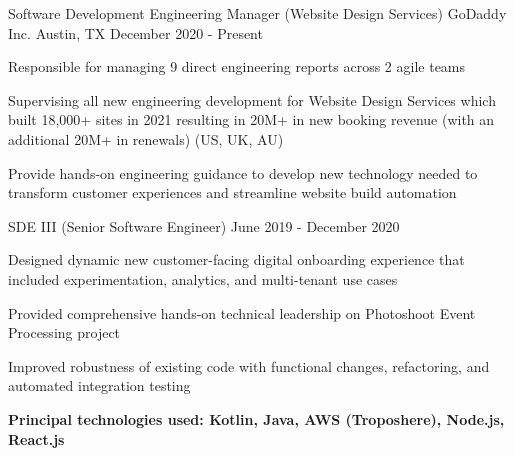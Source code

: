 

\begin{cventries}

  \cventry
    {Software Development Engineering Manager (Website Design Services)} %
    {GoDaddy Inc.} %
    {Austin, TX} %
    {December 2020 - Present} %
    {
      \begin{cvitems} %
        \item {Responsible for managing 9 direct engineering reports across 2 agile teams}
        \item {Supervising all new engineering development for Website Design Services which built 18,000+ sites in 2021 resulting in 20M+ in new booking revenue (with an additional 20M+ in renewals) (US, UK, AU)}
        \item {Provide hands-on engineering guidance to develop new technology needed to transform customer experiences and
streamline website build automation}
      \end{cvitems}
    }

  \cventry
    {SDE III (Senior Software Engineer)} %
    {} %
    {} %
    {June 2019 - December 2020} %
    {
      \begin{cvitems} %
              \item {Designed dynamic new customer-facing digital onboarding experience that included experimentation, analytics, and multi-tenant use cases}
        \item {Provided comprehensive hands-on technical leadership on Photoshoot Event Processing project}
        \item {Improved robustness of existing code with functional changes, refactoring, and automated integration testing}
        \item {\textbf{Principal technologies used: Kotlin, Java, AWS (Troposhere), Node.js, React.js}}
      \end{cvitems}
    }


\end{cventries}

